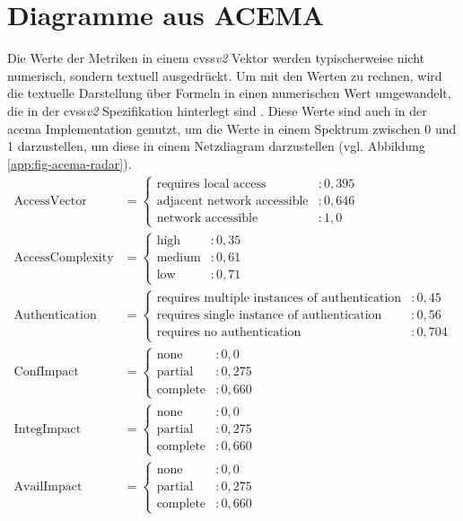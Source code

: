 \chapter{Diagramme aus ACEMA}
\label{app:acema-diagrams}
Die Werte der Metriken in einem \gls{cvss}\textit{v2} Vektor werden typischerweise nicht numerisch, sondern textuell ausgedrückt. Um mit den Werten zu rechnen, wird die textuelle Darstellung über Formeln in einen numerischen Wert umgewandelt, die in der \gls{cvss}\textit{v2} Spezifikation hinterlegt sind \autocite{CVSSV2Complete}. Diese Werte sind auch in der \gls{acema} Implementation genutzt, um die Werte in einem Spektrum zwischen 0 und 1 darzustellen, um diese in einem Netzdiagram darzustellen (vgl. Abbildung \ref{app:fig-acema-radar}).
\[
\begin{aligned}
\text{AccessVector} & = 
\begin{cases} 
    \text{requires local access} & : 0{,}395 \\
    \text{adjacent network accessible} & : 0{,}646 \\
    \text{network accessible} & : 1{,}0
\end{cases} \\[10pt]
\text{AccessComplexity} & = 
\begin{cases} 
    \text{high} & : 0{,}35 \\
    \text{medium} & : 0{,}61 \\
    \text{low} & : 0{,}71
\end{cases} \\[10pt]
\text{Authentication} & = 
\begin{cases} 
    \text{requires multiple instances of authentication} & : 0{,}45 \\
    \text{requires single instance of authentication} & : 0{,}56 \\
    \text{requires no authentication} & : 0{,}704
\end{cases} \\[10pt]
\text{ConfImpact} & = 
\begin{cases} 
    \text{none} & : 0{,}0 \\
    \text{partial} & : 0{,}275 \\
    \text{complete} & : 0{,}660
\end{cases} \\[10pt]
\text{IntegImpact} & = 
\begin{cases} 
    \text{none} & : 0{,}0 \\
    \text{partial} & : 0{,}275 \\
    \text{complete} & : 0{,}660
\end{cases} \\[10pt]
\text{AvailImpact} & = 
\begin{cases} 
    \text{none} & : 0{,}0 \\
    \text{partial} & : 0{,}275 \\
    \text{complete} & : 0{,}660
\end{cases}
\end{aligned}
\]


